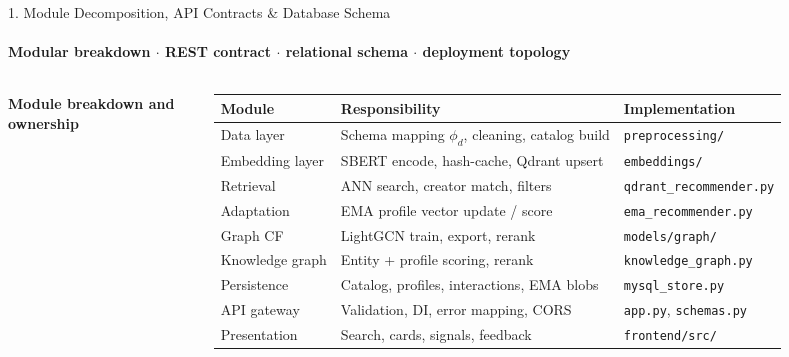 \documentclass[aspectratio=169, 11pt]{beamer}
\begin{document}
\begin{frame}[fragile]{1. Module Decomposition, API Contracts \& Database Schema}
\framesubtitle{Modular breakdown $\cdot$ REST contract $\cdot$ relational schema $\cdot$ deployment topology}
\vspace{-1mm}
\begin{columns}[T]
{\scriptsize \textbf{Module breakdown and ownership}}
\vspace{-1mm}
\begin{table}
\centering
\tiny
\renewcommand{\arraystretch}{1.18}
\begin{tabular}{p{1.70cm} p{2.35cm} p{2.35cm}}
\toprule
\textbf{Module} & \textbf{Responsibility} & \textbf{Implementation} \\
\midrule
Data layer & Schema mapping $\phi_d$, cleaning, catalog build & \texttt{preprocessing/} \\
Embedding layer & SBERT encode, hash-cache, Qdrant upsert & \texttt{embeddings/} \\
Retrieval & ANN search, creator match, filters & \texttt{qdrant\_recommender.py} \\
Adaptation & EMA profile vector update / score & \texttt{ema\_recommender.py} \\
Graph CF & LightGCN train, export, rerank & \texttt{models/graph/} \\
Knowledge graph & Entity + profile scoring, rerank & \texttt{knowledge\_graph.py} \\
Persistence & Catalog, profiles, interactions, EMA blobs & \texttt{mysql\_store.py} \\
API gateway & Validation, DI, error mapping, CORS & \texttt{app.py}, \texttt{schemas.py} \\
Presentation & Search, cards, signals, feedback & \texttt{frontend/src/} \\
\bottomrule
\end{tabular}
\end{table}


\end{columns}
\end{frame}
\end{document}
